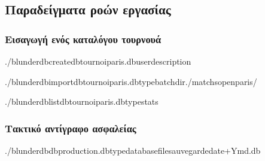 \documentclass[letterpaper,10pt,greek]{sphinxmanual}
\begin{document}
\subsection{Παραδείγματα ροών εργασίας}
\label{\detokenize{cli:exemples-de-flux-de-travail}}

\subsubsection{Εισαγωγή ενός καταλόγου τουρνουά}
\label{\detokenize{cli:import-d-un-repertoire-de-tournoi}}
\begin{sphinxVerbatim}[commandchars=\\\{\}]
./blunderdbcreate\PYGZhy{}\PYGZhy{}dbtournoi\PYGZus{}paris.db\PYGZhy{}\PYGZhy{}user\PYGZhy{}\PYGZhy{}description

./blunderdbimport\PYGZhy{}\PYGZhy{}dbtournoi\PYGZus{}paris.db\PYGZhy{}\PYGZhy{}typebatch\PYGZhy{}\PYGZhy{}dir./matchs\PYGZus{}open\PYGZus{}paris/

./blunderdblist\PYGZhy{}\PYGZhy{}dbtournoi\PYGZus{}paris.db\PYGZhy{}\PYGZhy{}typestats
\end{sphinxVerbatim}


\subsubsection{Τακτικό αντίγραφο ασφαλείας}
\label{\detokenize{cli:sauvegarde-reguliere}}
\begin{sphinxVerbatim}[commandchars=\\\{\}]
./blunderdb\PYGZhy{}\PYGZhy{}dbproduction.db\PYGZhy{}\PYGZhy{}typedatabase\PYGZhy{}\PYGZhy{}filesauvegarde\PYGZhy{}date+\PYGZpc{}Y\PYGZpc{}m\PYGZpc{}d.db
\end{sphinxVerbatim}
\end{document}
